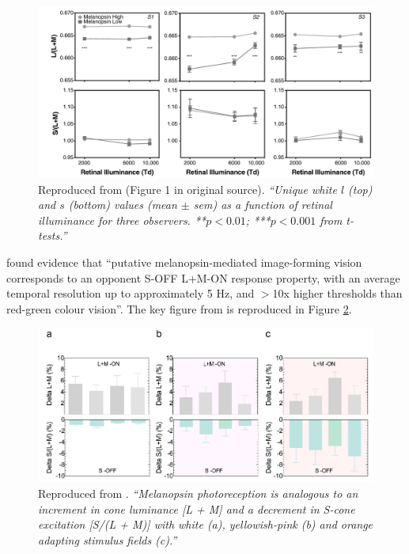 \begin{figure}[htbp]
\includegraphics[max width=\textwidth, center]{figs/LitRev/cao.png}
\caption{Reproduced from \citet{cao_evidence_2018} (Figure 1 in original source). \textit{``Unique white $l$ (top) and $s$ (bottom) values (mean $\pm$ sem)
as a function of retinal illuminance for three observers. **$p < 0.01$;
***$p < 0.001$ from t-tests.''}}
\label{fig:cao}
\end{figure}

\citet{zele_melanopsin_2018} found evidence that ``putative melanopsin-mediated image-forming vision corresponds to an opponent S-OFF L+M-ON response property, with an average temporal resolution up to approximately 5 Hz, and $>$10x higher thresholds than red-green colour vision''. The key figure from \citet{zele_melanopsin_2018} is reproduced in Figure \ref{fig:zele}.

\begin{figure}[htbp]
\includegraphics[max width=\textwidth, center]{figs/LitRev/zele.png}
\caption{Reproduced from \citet{zele_melanopsin_2018}. \textit{``Melanopsin photoreception is analogous to an increment in cone luminance [L + M] and a decrement in S-cone excitation [S/(L + M)] with white (a), yellowish-pink (b) and orange adapting stimulus fields (c).''}}
\label{fig:zele}
\end{figure}

